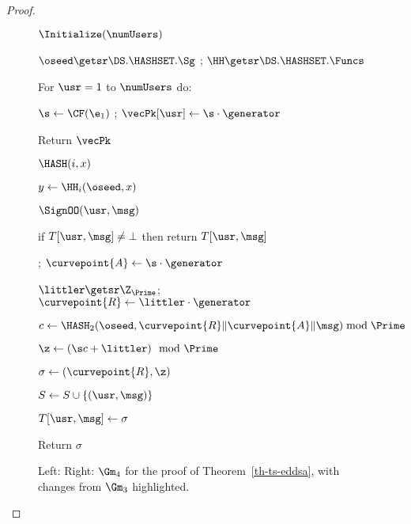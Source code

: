 \begin{proof}
	\begin{figure}
		{
		
		
		\begin{oracle}{$\Initialize(\numUsers)$}
			\item $\oseed\getsr\DS.\HASHSET.\Sg$ ; 
			$\HH \getsr \DS.\HASHSET.\Funcs$
			\item For $\usr=1$ to $\numUsers$ do:
			\item \quad {}
			\item \quad $\s \gets \CF(\e_1)$ ; $\vecPk[\usr] \gets \s\cdot \generator$
			\item {}
			\item Return $\vecPk$
		\end{oracle}
		\ExptSepSpace
		
				\begin{oracle}{$\HASH(i,x)$}
			\item $y \gets \HH_i(\oseed,x)$
			\item {}
		\end{oracle}
	}{
		\ExptSepSpace
		\begin{oracle}{$\SignOO(\usr, \msg)$}
			\item if $T[\usr, \msg] \neq \bot$ then return $T[\usr, \msg]$
			\item {}; $\curvepoint{A} \gets \s\cdot \generator$
			\item $\littler \getsr \Z_{\Prime}$; $\curvepoint{R} \gets \littler\cdot \generator$
			\item $c \gets \HASH_2(\oseed, \curvepoint{R}\|\curvepoint{A}\|\msg) \bmod \Prime$
			\item $\z \gets (\s c + \littler) \mod \Prime$
			\item $\sigma \gets (\curvepoint{R},\z)$
			\item $S \gets S \cup \{(\usr, \msg)\}$
			\item $T[\usr, \msg] \gets \sigma$
			\item Return $\sigma$
		\end{oracle}
		\ExptSepSpace
		
	
		}
		\vspace{-5pt}
		\caption{Left:  Right: $\Gm_4$ for the proof of Theorem~\ref{th-ts-eddsa}, with changes from $\Gm_3$ highlighted.}
		\label{fig:gm-pf-ts-eddsa-234}
		\hrulefill
		\vspace{-10pt}
	\end{figure}
	

\end{proof}
